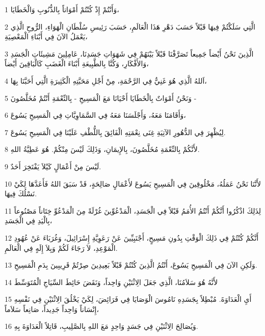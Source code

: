 \par 1 وَأَنْتُمْ إِذْ كُنْتُمْ أَمْوَاتاً بِالذُّنُوبِ وَالْخَطَايَا،
\par 2 الَّتِي سَلَكْتُمْ فِيهَا قَبْلاً حَسَبَ دَهْرِ هَذَا الْعَالَمِ، حَسَبَ رَئِيسِ سُلْطَانِ الْهَوَاءِ، الرُّوحِ الَّذِي يَعْمَلُ الآنَ فِي أَبْنَاءِ الْمَعْصِيَةِ،
\par 3 الَّذِينَ نَحْنُ أَيْضاً جَمِيعاً تَصَرَّفْنَا قَبْلاً بَيْنَهُمْ فِي شَهَوَاتِ جَسَدِنَا، عَامِلِينَ مَشِيئَاتِ الْجَسَدِ وَالأَفْكَارِ، وَكُنَّا بِالطَّبِيعَةِ أَبْنَاءَ الْغَضَبِ كَالْبَاقِينَ أَيْضاً،
\par 4 اَللهُ الَّذِي هُوَ غَنِيٌّ فِي الرَّحْمَةِ، مِنْ أَجْلِ مَحَبَّتِهِ الْكَثِيرَةِ الَّتِي أَحَبَّنَا بِهَا،
\par 5 وَنَحْنُ أَمْوَاتٌ بِالْخَطَايَا أَحْيَانَا مَعَ الْمَسِيحِ - بِالنِّعْمَةِ أَنْتُمْ مُخَلَّصُونَ -
\par 6 وَأَقَامَنَا مَعَهُ، وَأَجْلَسَنَا مَعَهُ فِي السَّمَاوِيَّاتِ فِي الْمَسِيحِ يَسُوعَ،
\par 7 لِيُظْهِرَ فِي الدُّهُورِ الآتِيَةِ غِنَى نِعْمَتِهِ الْفَائِقَ بِاللُّطْفِ عَلَيْنَا فِي الْمَسِيحِ يَسُوعَ.
\par 8 لأَنَّكُمْ بِالنِّعْمَةِ مُخَلَّصُونَ، بِالإِيمَانِ، وَذَلِكَ لَيْسَ مِنْكُمْ. هُوَ عَطِيَّةُ اللهِ.
\par 9 لَيْسَ مِنْ أَعْمَالٍ كَيْلاَ يَفْتَخِرَ أَحَدٌ.
\par 10 لأَنَّنَا نَحْنُ عَمَلُهُ، مَخْلُوقِينَ فِي الْمَسِيحِ يَسُوعَ لأَعْمَالٍ صَالِحَةٍ، قَدْ سَبَقَ اللهُ فَأَعَدَّهَا لِكَيْ نَسْلُكَ فِيهَا.
\par 11 لِذَلِكَ اذْكُرُوا أَنَّكُمْ أَنْتُمُ الأُمَمُ قَبْلاً فِي الْجَسَدِ، الْمَدْعُوِّينَ غُرْلَةً مِنَ الْمَدْعُوِّ خِتَاناً مَصْنُوعاً بِالْيَدِ فِي الْجَسَدِ،
\par 12 أَنَّكُمْ كُنْتُمْ فِي ذَلِكَ الْوَقْتِ بِدُونِ مَسِيحٍ، أَجْنَبِيِّينَ عَنْ رَعَوِيَّةِ إِسْرَائِيلَ، وَغُرَبَاءَ عَنْ عُهُودِ الْمَوْعِدِ، لاَ رَجَاءَ لَكُمْ وَبِلاَ إِلَهٍ فِي الْعَالَمِ.
\par 13 وَلَكِنِ الآنَ فِي الْمَسِيحِ يَسُوعَ، أَنْتُمُ الَّذِينَ كُنْتُمْ قَبْلاً بَعِيدِينَ صِرْتُمْ قَرِيبِينَ بِدَمِ الْمَسِيحِ.
\par 14 لأَنَّهُ هُوَ سَلاَمُنَا، الَّذِي جَعَلَ الِاثْنَيْنِ وَاحِداً، وَنَقَضَ حَائِطَ السِّيَاجِ الْمُتَوَسِّطَ
\par 15 أَيِ الْعَدَاوَةَ. مُبْطِلاً بِجَسَدِهِ نَامُوسَ الْوَصَايَا فِي فَرَائِضَ، لِكَيْ يَخْلُقَ الِاثْنَيْنِ فِي نَفْسِهِ إِنْسَاناً وَاحِداً جَدِيداً، صَانِعاً سَلاَماً،
\par 16 وَيُصَالِحَ الِاثْنَيْنِ فِي جَسَدٍ وَاحِدٍ مَعَ اللهِ بِالصَّلِيبِ، قَاتِلاً الْعَدَاوَةَ بِهِ.
